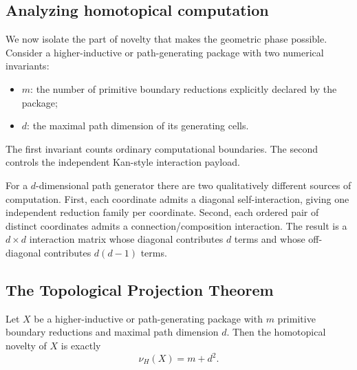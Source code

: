 \documentclass{lmcs}
\begin{document}
\subsection{Analyzing homotopical computation}

We now isolate the part of novelty that makes the geometric phase possible. Consider a higher-inductive or path-generating package with two numerical invariants:
\begin{itemize}
    \item $m$: the number of primitive boundary reductions explicitly declared by the package;
    \item $d$: the maximal path dimension of its generating cells.
\end{itemize}
The first invariant counts ordinary computational boundaries. The second controls the independent Kan-style interaction payload.

For a $d$-dimensional path generator there are two qualitatively different sources of computation. First, each coordinate admits a diagonal self-interaction, giving one independent reduction family per coordinate. Second, each ordered pair of distinct coordinates admits a connection/composition interaction. The result is a $d \times d$ interaction matrix whose diagonal contributes $d$ terms and whose off-diagonal contributes $d(d-1)$ terms.

\subsection{The Topological Projection Theorem}

\begin{thm}
\label{thm:projection}
Let $X$ be a higher-inductive or path-generating package with $m$ primitive boundary reductions and maximal path dimension $d$. Then the homotopical novelty of $X$ is exactly
\[
  \nu_H(X) = m + d^2.
\]
\end{thm}
\end{document}
